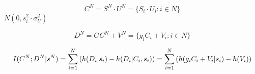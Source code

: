 \begin{equation}
C^N= S^N \cdot U^N = \{ S_i\cdot U_i : i \in N \}
\end{equation}
$N(0, s_i^2 \cdot \sigma^2_U)$

\begin{equation}
D^N= GC^N + V^N = \{ g_i C_i + V_i : i \in N \}
\end{equation}

\begin{equation}
I(C^N; D^N|s^N)  = \sum_{i=1}^N{(h(D_i|s_i)-h(D_i|C_i,s_i))} \\
= \sum_{i=1}^N{(h( g_i C_i + V_i|s_i)-h(V_i))}
\end{equation}